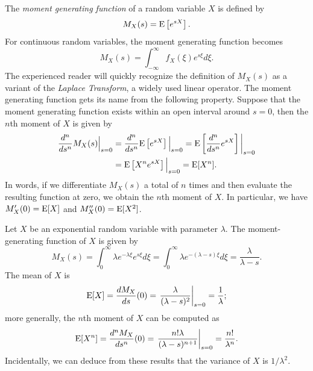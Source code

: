 The \emph{moment generating function} of a random variable $X$ is defined by
\begin{equation*}
M_X (s) = \mathrm{E} \left[ e^{s X} \right] .
\end{equation*}
For continuous random variables, the moment generating function becomes
\begin{equation*}
M_X (s) = \int_{-\infty}^{\infty} f_X (\xi) e^{s \xi} d\xi .
\end{equation*}
The experienced reader will quickly recognize the definition of $M_X(s)$ as a variant of the \emph{Laplace Transform}, a widely used linear operator.
The moment generating function gets its name from the following property.
Suppose that the moment generating function exists within an open interval around $s = 0$, then the $n$th moment of $X$ is given by
\begin{equation*}
\begin{split}
\frac{d^n}{ds^n} M_X (s) \Big|_{s=0}
&= \frac{d^n}{ds^n} \mathrm{E} \left[ e^{s X} \right] \Big|_{s=0}
= \mathrm{E} \left[ \frac{d^n}{ds^n} e^{s X} \right] \bigg|_{s=0} \\
&= \mathrm{E} \left[ X^n e^{s X} \right] \Big|_{s=0}
= \mathrm{E} [X^n] .
\end{split}
\end{equation*}
In words, if we differentiate $M_X(s)$ a total of $n$ times and then evaluate the resulting function at zero, we obtain the $n$th moment of $X$.
In particular, we have $M_X'(0) = \mathrm{E} [X]$ and $M_X''(0) = \mathrm{E} [X^2]$.

\begin{example}
Let $X$ be an exponential random variable with parameter $\lambda$.
The moment-generating function of $X$ is given by
\begin{equation*}
M_X (s) = \int_0^{\infty} \lambda e^{-\lambda \xi} e^{s\xi} d\xi
= \int_0^{\infty} \lambda e^{-(\lambda-s) \xi} d\xi
= \frac{\lambda}{\lambda - s} .
\end{equation*}
The mean of $X$ is
\begin{equation*}
\mathrm{E} [X] = \frac{d M_X }{ds} (0)
= \left. \frac{\lambda}{(\lambda - s)^2} \right|_{s=0}
= \frac{1}{\lambda} ;
\end{equation*}
more generally, the $n$th moment of $X$ can be computed as
\begin{equation*}
\mathrm{E} [X^n] = \frac{d^n M_X }{ds^n} (0)
= \left. \frac{n! \lambda}{(\lambda - s)^{n+1}} \right|_{s=0}
= \frac{n!}{\lambda^n} .
\end{equation*}
Incidentally, we can deduce from these results that the variance of $X$ is $1/\lambda^2$.
\end{example}

